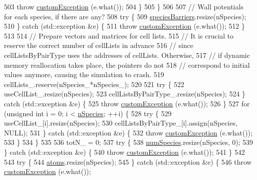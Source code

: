 \begin{DoxyCode}
503             \textcolor{keywordflow}{throw} \hyperlink{classcustom_exception}{customException} (e.what());
504         \}
505     \}
506 
507     \textcolor{comment}{// Wall potentials for each species, if there are any?}
508     \textcolor{keywordflow}{try} \{
509         \hyperlink{classsim_system_a5ae652ff4519f39c3862abae32a9581b}{speciesBarriers}.resize(nSpecies);
510     \} \textcolor{keywordflow}{catch} (std::exception &e) \{
511         \textcolor{keywordflow}{throw} \hyperlink{classcustom_exception}{customException} (e.what());
512     \}
513 
514     \textcolor{comment}{// Prepare vectors and matrices for cell lists.}
515     \textcolor{comment}{// It is crucial to reserve the correct number of cellLists in advance}
516     \textcolor{comment}{// since cellListsByPairType uses the addresses of cellLists. Otherwise,}
517     \textcolor{comment}{// if dynamic memory reallocation takes place, the pointers do not}
518     \textcolor{comment}{// correspond to initial values anymore, causing the simulation to crash.}
519     cellLists\_.reserve(nSpecies\_*nSpecies\_);
520 
521     \textcolor{keywordflow}{try} \{
522         useCellList\_.resize(nSpecies);
523         cellListsByPairType\_.resize(nSpecies);
524     \} \textcolor{keywordflow}{catch} (std::exception &e) \{
525         \textcolor{keywordflow}{throw} \hyperlink{classcustom_exception}{customException} (e.what());
526     \}
527     \textcolor{keywordflow}{for} (\textcolor{keywordtype}{unsigned} \textcolor{keywordtype}{int} i = 0; i < \hyperlink{classsim_system_ab5e2e9b6204de15520302fe1d51688dd}{nSpecies}; ++i) \{
528         \textcolor{keywordflow}{try} \{
529             useCellList\_[i].resize(nSpecies);
530             cellListsByPairType\_[i].assign(nSpecies, NULL);
531         \} \textcolor{keywordflow}{catch} (std::exception &e) \{
532             \textcolor{keywordflow}{throw} \hyperlink{classcustom_exception}{customException} (e.what());
533         \}
534     \}
535 
536     totN\_ = 0;
537         \textcolor{keywordflow}{try} \{
538         \hyperlink{classsim_system_a9eea865e6dc1cff377b1e79c4d9c23f0}{numSpecies}.resize(nSpecies, 0);
539     \} \textcolor{keywordflow}{catch} (std::exception &e) \{
540         \textcolor{keywordflow}{throw} \hyperlink{classcustom_exception}{customException} (e.what());
541     \}
542 
543     \textcolor{keywordflow}{try} \{
544         \hyperlink{classsim_system_a90421b19082f7fb8fc23b7264b1161e4}{atoms}.resize(nSpecies);
545     \} \textcolor{keywordflow}{catch} (std::exception &e) \{
546         \textcolor{keywordflow}{throw} \hyperlink{classcustom_exception}{customException} (e.what());

\end{DoxyCode}
